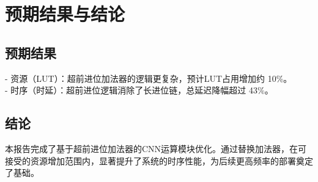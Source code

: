 \documentclass{ctexart}
\begin{document}
\section{预期结果与结论}
\subsection{预期结果}
- 资源（LUT）：超前进位加法器的逻辑更复杂，预计LUT占用增加约 10\%。 \\
\indent - 时序（时延）：超前进位逻辑消除了长进位链，总延迟降幅超过 43\%。

\subsection{结论}
本报告完成了基于超前进位加法器的CNN运算模块优化。通过替换加法器，在可接受的资源增加范围内，显著提升了系统的时序性能，为后续更高频率的部署奠定了基础。
\end{document}
